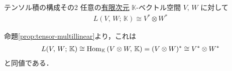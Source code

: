 \documentclass[rep_main]{subfiles}
\begin{document}
\begin{myprop}[label=prop:fin-tensor-dual]{テンソル積の構成その2}
	任意の\underline{有限次元} $\mathbb{K}$-ベクトル空間 $V,\, W$ に対して
    \begin{align}
		L(V,\, W;\, \mathbb{K}) \cong V^* \otimes W^*
	\end{align}
\end{myprop}

\begin{marker}
    命題\ref{prop:tensor-multillinear}より，これは 
    \begin{align}
        L(V,\, W;\, \mathbb{K}) \cong \mathrm{Hom}_{\mathbb{K}} \mathop{}(V \otimes W,\, \mathbb{K}) = (V \otimes W)^* \cong V^* \otimes W^*
    \end{align}
    と同値である．
\end{marker}
\end{document}
